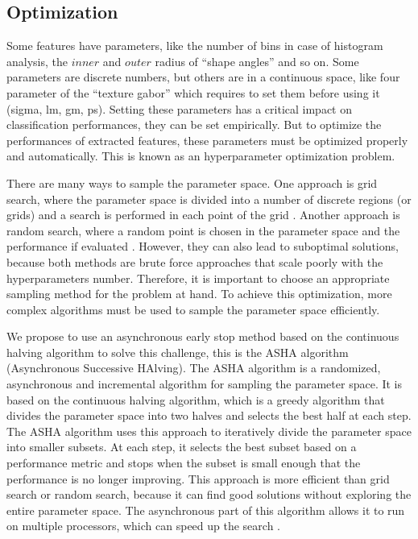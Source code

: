 \documentclass[../thesis.tex]{subfiles}
\begin{document}
    
    \subsection{Optimization}
    \label{sec:weed-discrimination-optimization}
    
    Some features have parameters, like the number of bins in case of histogram analysis, the $inner$ and $outer$ radius of ``shape angles'' and so on. Some parameters are discrete numbers, but others are in a continuous space, like four parameter of the ``texture gabor'' which requires to set them before using it (sigma, lm, gm, ps). Setting these parameters has a critical impact on classification performances, they can be set empirically. But to optimize the performances of extracted features, these parameters must be optimized properly and automatically. This is known as an hyperparameter optimization problem.
    
    There are many ways to sample the parameter space. One approach is grid search, where the parameter space is divided into a number of discrete regions (or grids) and a search is performed in each point of the grid \cite{lawler1966branch}. Another approach is random search, where a random point is chosen in the parameter space and the performance if evaluated \cite{bergstra2012random}. However, they can also lead to suboptimal solutions, because both methods are brute force approaches that scale poorly with the hyperparameters number. Therefore, it is important to choose an appropriate sampling method for the problem at hand. To achieve this optimization, more complex algorithms must be used to sample the parameter space efficiently.
    
    \newpage
    We propose to use an asynchronous early stop method based on the continuous halving algorithm to solve this challenge, this is the ASHA algorithm (Asynchronous Successive HAlving). The ASHA algorithm is a randomized, asynchronous and incremental algorithm for sampling the parameter space. It is based on the continuous halving algorithm, which is a greedy algorithm that divides the parameter space into two halves and selects the best half at each step. The ASHA algorithm uses this approach to iteratively divide the parameter space into smaller subsets. At each step, it selects the best subset based on a performance metric and stops when the subset is small enough that the performance is no longer improving. This approach is more efficient than grid search or random search, because it can find good solutions without exploring the entire parameter space. The asynchronous part of this algorithm allows it to run on multiple processors, which can speed up the search \cite{hertel2020sherpa}.
    
\end{document}
